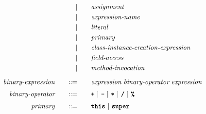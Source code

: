\begin{alignat*}{9}
&&                                               &&         | & \quad && \textit{assignment} && \\
&&                                               &&         | & \quad && \textit{expression-name} && \\
&&                                               &&         | & \quad && \textit{literal} && \\
&&                                               &&         | & \quad && \textit{primary} && \\
&&                                               &&         | & \quad && \textit{class-instance-creation-expression} && \\
&&                                               &&         | & \quad && \textit{field-access} && \\
&&                                               &&         | & \quad && \textit{method-invocation} && \\[2mm]
&& \textit{binary-expression}                    && \quad ::= & \quad && \textit{expression} \ \textit{binary-operator} \ \textit{expression} && \\[1mm]
&& \textit{binary-operator}                      && \quad ::= & \quad && \textbf{\texttt{+}} \ | \ \textbf{\texttt{-}} \ | \ \textbf{\texttt{*}} \ | \ \textbf{\texttt{/}} \ | \ \textbf{\texttt{\%}} && \\[1mm]
&& \textit{primary}                              && \quad ::= & \quad && \textbf{\texttt{this}} \ | \ \textbf{\texttt{super}} && \\[1mm]
\end{alignat*}
